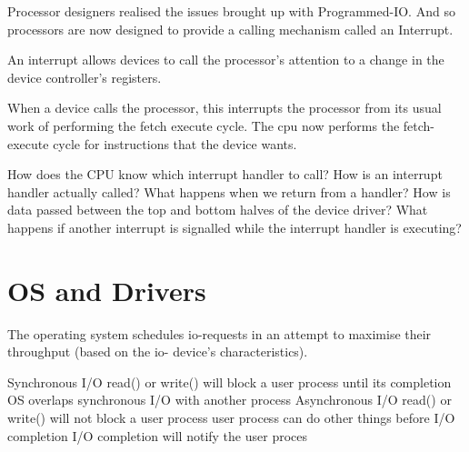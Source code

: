 Processor designers realised the issues brought up with Programmed-IO.
And so processors are now designed to provide a calling mechanism called an Interrupt.



An interrupt allows devices to call the processor’s attention to a 
change in the device controller’s registers.

When a device calls the processor, this interrupts the processor 
from its usual work of performing the fetch execute cycle. 
The cpu now performs the fetch-execute cycle for instructions that the device wants. 

How does the CPU know which interrupt handler to call?
How is an interrupt handler actually called?
What happens when we return from a handler?
How is data passed between the top and bottom halves of the device driver?
What happens if another interrupt is signalled while the interrupt handler is executing?




\section{OS and Drivers}





The operating system schedules io-requests in an attempt to maximise their throughput (based on the io- device’s characteristics).






Synchronous I/O read() or write() will block a user process until its completion 
OS overlaps synchronous I/O with another process 
Asynchronous I/O read() or write() will not block a user process 
user process can do other things before I/O completion 
I/O completion will notify the user proces
